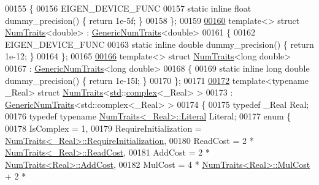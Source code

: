 \begin{DoxyCode}
00155 \{
00156   EIGEN\_DEVICE\_FUNC
00157   \textcolor{keyword}{static} \textcolor{keyword}{inline} \textcolor{keywordtype}{float} dummy\_precision() \{ \textcolor{keywordflow}{return} 1e-5f; \}
00158 \};
00159 
\hyperlink{struct_eigen_1_1_num_traits_3_01double_01_4}{00160} \textcolor{keyword}{template}<> \textcolor{keyword}{struct }\hyperlink{group___core___module_struct_eigen_1_1_num_traits}{NumTraits}<double> : \hyperlink{struct_eigen_1_1_generic_num_traits}{GenericNumTraits}<double>
00161 \{
00162   EIGEN\_DEVICE\_FUNC
00163   \textcolor{keyword}{static} \textcolor{keyword}{inline} \textcolor{keywordtype}{double} dummy\_precision() \{ \textcolor{keywordflow}{return} 1e-12; \}
00164 \};
00165 
\hyperlink{struct_eigen_1_1_num_traits_3_01long_01double_01_4}{00166} \textcolor{keyword}{template}<> \textcolor{keyword}{struct }\hyperlink{group___core___module_struct_eigen_1_1_num_traits}{NumTraits}<long double>
00167   : \hyperlink{struct_eigen_1_1_generic_num_traits}{GenericNumTraits}<long double>
00168 \{
00169   \textcolor{keyword}{static} \textcolor{keyword}{inline} \textcolor{keywordtype}{long} \textcolor{keywordtype}{double} dummy\_precision() \{ \textcolor{keywordflow}{return} 1e-15l; \}
00170 \};
00171 
\hyperlink{struct_eigen_1_1_num_traits_3_01std_1_1complex_3_01___real_01_4_01_4}{00172} \textcolor{keyword}{template}<\textcolor{keyword}{typename} \_Real> \textcolor{keyword}{struct }\hyperlink{group___core___module_struct_eigen_1_1_num_traits}{NumTraits}<\hyperlink{namespacestd}{std}::\hyperlink{structcomplex}{complex}<\_Real> >
00173   : \hyperlink{struct_eigen_1_1_generic_num_traits}{GenericNumTraits}<std::complex<\_Real> >
00174 \{
00175   \textcolor{keyword}{typedef} \_Real Real;
00176   \textcolor{keyword}{typedef} \textcolor{keyword}{typename} \hyperlink{group___core___module_struct_eigen_1_1_num_traits}{NumTraits<\_Real>::Literal} Literal;
00177   \textcolor{keyword}{enum} \{
00178     IsComplex = 1,
00179     RequireInitialization = \hyperlink{group___core___module_struct_eigen_1_1_num_traits}{NumTraits<\_Real>::RequireInitialization},
00180     ReadCost = 2 * \hyperlink{group___core___module_struct_eigen_1_1_num_traits}{NumTraits<\_Real>::ReadCost},
00181     AddCost = 2 * \hyperlink{group___core___module_struct_eigen_1_1_num_traits}{NumTraits<Real>::AddCost},
00182     MulCost = 4 * \hyperlink{group___core___module_struct_eigen_1_1_num_traits}{NumTraits<Real>::MulCost} + 2 * 

\end{DoxyCode}
